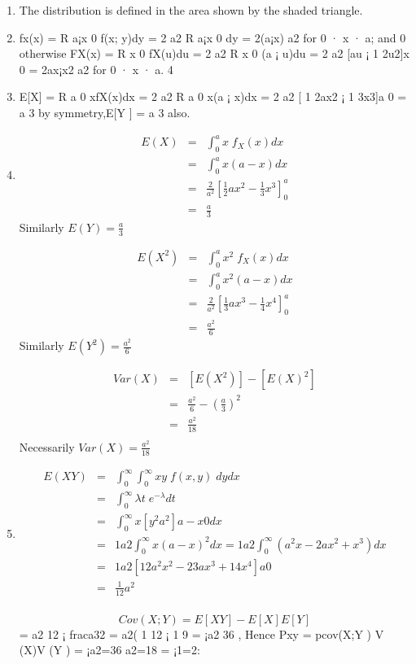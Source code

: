 \documentclass[a4paper,12pt]{article}
\begin{document}
\begin{enumerate}
\item The distribution is defined in the area shown by the shaded triangle.

\item  fx(x) =
R a¡x
0 f(x; y)dy = 2
a2
R a¡x
0 dy = 2(a¡x)
a2 for 0 · x · a; and 0 otherwise
FX(x) =
R x
0 fX(u)du = 2
a2
R x
0 (a ¡ u)du = 2
a2 [au ¡ 1
2u2]x
0 = 2ax¡x2
a2 for 0 · x · a.
4
\item E[X] =
R a
0 xfX(x)dx = 2
a2
R a
0 x(a ¡ x)dx = 2
a2 [ 1
2ax2 ¡ 1
3x3]a
0 = a
3 by symmetry,E[Y ] = a
3
also.
\item 

\begin{eqnarray*}
E(X) &=& \int^{a}_{0} x \;f_X(x) dx \\
    &=&\int^{a}_{0} x(a-x) dx \\
    &=&  \frac{2}{a^2}\left[ \frac{1}{2}ax^2 - \frac{1}{3}x^3  \right]^{a}_{0}\\
    &=& \frac{a}{3}  
\end{eqnarray*}
Similarly $E(Y) = \frac{a}{3} $

\begin{eqnarray*}
E(X^2) &=& \int^{a}_{0} x^2 \;f_X(x) dx \\
    &=&\int^{a}_{0} x^2(a-x) dx \\
    &=&  \frac{2}{a^2}\left[ \frac{1}{3}ax^3 - \frac{1}{4}x^4  \right]^{a}_{0}\\
    &=& \frac{a^2}{6}  
\end{eqnarray*}
Similarly $E(Y^2) = \frac{a^2}{6} $

\begin{eqnarray*}
Var(X) &=& [E(X^2)] - [E(X)^2] \\
      &=& \frac{a^2}{6} - \left(\frac{a}{3}\right)^2 \\
     &=& \frac{a^2}{18} \\
\end{eqnarray*}
Necessarily $Var(X) = \frac{a^2}{18}$


\item 

\begin{eqnarray}
E(XY) &=& \int^{\infty}_{0} \int^{\infty}_{0} xy\; f(x,y) \; dydx \\
    &=&\int^{\infty}_{0} \lambda t\;e^{-\lambda} dt \\
&=&
\int^{\infty}_{0} x[ y^2
a^2 ]a-x
0 dx \\ &=& 1
a2
\int^{\infty}_{0} x(a - x)^2dx = 1
a2
\int^{\infty}_{0}(a^2x - 2ax^2 + x^3)dx\\
&=& 1
a2 [ 1
2a^2x^2 - 2
3ax^3 + 1
4x^4]a
0\\ &=& \frac{1}{12}a^2\\
\end{eqnarray}


\[Cov(X; Y ) = E[XY ] - E[X]E[Y ]\] = a2
12 ¡ fraca32 = a2( 1
12 ¡ 1
9 = ¡a2
36 ,
Hence Pxy = pcov(X;Y )
V (X)V (Y )
= ¡a2=36
a2=18 = ¡1=2:
\end{enumerate}
\end{document}
